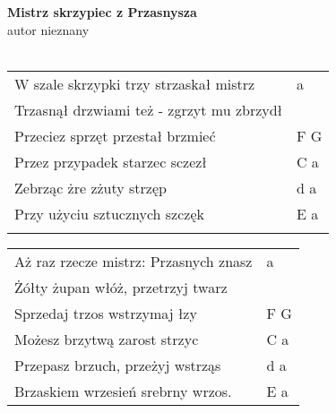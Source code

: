 \documentclass[a5paper]{article}
\begin{document}


\noindent
\fontsize{12pt}{15pt}\selectfont
\textbf{Mistrz skrzypiec z Przasnysza} \\
\fontsize{8pt}{10pt}\selectfont
autor nieznany \\ \\
\fontsize{10pt}{12pt}\selectfont
{}
\begin{tabular}{@{}p{8.50cm}p{3cm}@{}}
\noindent
W szale skrzypki trzy strzaskał mistrz & a \\
Trzasnął drzwiami też - zgrzyt mu zbrzydł & \\
Przeciez sprzęt przestał brzmieć & F G \\
Przez przypadek starzec sczezł & C a \\
Zebrząc żre zżuty strzęp & d a \\
Przy użyciu sztucznych szczęk & E a \\ \\
\end{tabular}

\noindent
\begin{tabular}{@{}p{8.50cm}p{3cm}@{}}
Aż raz rzecze mistrz: Przasnych znasz & a \\
Żółty żupan włóż, przetrzyj twarz & \\
Sprzedaj trzos wstrzymaj łzy & F G \\
Możesz brzytwą zarost strzyc & C a \\
Przepasz brzuch, przeżyj wstrząs & d a \\
Brzaskiem wrzesień srebrny wrzos. & E a
\end{tabular}
\end{document}
